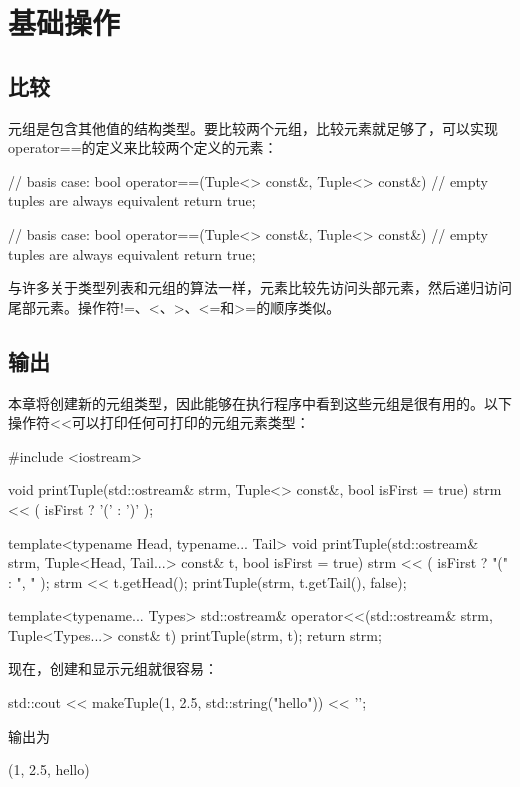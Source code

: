 \section{基础操作}



\subsection{比较}

元组是包含其他值的结构类型。要比较两个元组，比较元素就足够了，可以实现operator==的定义来比较两个定义的元素：

\begin{cpp}
// basis case:
bool operator==(Tuple<> const&, Tuple<> const&) {
	// empty tuples are always equivalent
	return true;
}

// basis case:
bool operator==(Tuple<> const&, Tuple<> const&) {
	// empty tuples are always equivalent
	return true;
}
\end{cpp}

与许多关于类型列表和元组的算法一样，元素比较先访问头部元素，然后递归访问尾部元素。操作符!=、<、>、<=和>=的顺序类似。

\subsection{输出}

本章将创建新的元组类型，因此能够在执行程序中看到这些元组是很有用的。以下操作符<{}<可以打印任何可打印的元组元素类型：

\begin{cpp}
#include <iostream>

void printTuple(std::ostream& strm, Tuple<> const&, bool isFirst = true) {
	strm << ( isFirst ? '(' : ')' );
}

template<typename Head, typename... Tail>
void printTuple(std::ostream& strm, Tuple<Head, Tail...> const& t,
				bool isFirst = true) {
	strm << ( isFirst ? "(" : ", " );
	strm << t.getHead();
	printTuple(strm, t.getTail(), false);
}

template<typename... Types>
std::ostream& operator<<(std::ostream& strm, Tuple<Types...> const& t) {
	printTuple(strm, t);
	return strm;
}
\end{cpp}

现在，创建和显示元组就很容易：

\begin{cpp}
std::cout << makeTuple(1, 2.5, std::string("hello")) << '\n';
\end{cpp}

输出为

\begin{shell}
(1, 2.5, hello)
\end{shell}





















